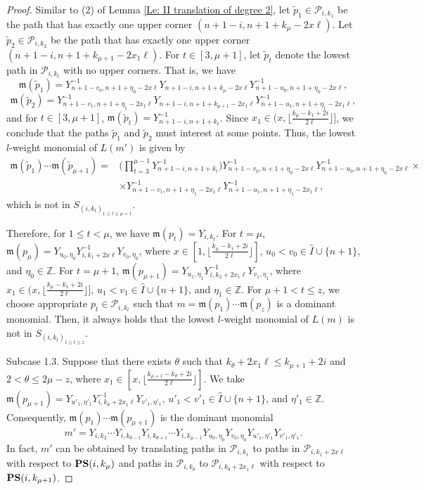 \documentclass[10pt,a4paper]{amsart}
\begin{document}
\begin{proof}
Similar to (2) of Lemma \ref{Le: II translation of degree 2}, let $\widetilde{p}_1\in \mathscr{P}_{i,k_1}$ be the path that has exactly one upper corner $(n+1-i,n+1+k_{\mu}-2x \ell)$. Let $\widetilde{p}_2\in \mathscr{P}_{i,k_2}$ be the path that has exactly one upper corner $(n+1-i,n+1+k_{\mu+1}-2x_1 \ell)$. For $t\in[3, \mu+1]$, let $\widetilde{p}_t$ denote the lowest path in $\mathscr{P}_{i,k_t}$ with no upper corners. That is, we have 
\[\mathfrak{m}(\widetilde{p}_{1})=Y_{n+1-v_0,n+1+\eta_0-2x \ell}^{-1}Y_{n+1-i,n+1+k_{\mu}-2x \ell}Y_{n+1-u_0, n+1+\eta_0-2x \ell}^{-1},
\]
\[
\mathfrak{m}(\widetilde{p}_{2})=Y_{n+1-v_1,n+1+\eta_1-2x_1 \ell}^{-1}Y_{n+1-i,n+1+k_{\mu+1}-2x_1 \ell}Y_{n+1-u_1, n+1+\eta_1-2x_1 \ell}^{-1},
\]
and for $t\in[3, \mu+1]$, $\mathfrak{m}(\widetilde{p}_{t})=Y_{n+1-i,n+1+k_t}^{-1}$. Since $x_1\in (x,\lfloor\frac{k_\mu-k_1+2i}{2 \ell}\rfloor]$, we conclude that the paths $\widetilde{p}_{1}$ and $\widetilde{p}_{2}$ must interest at some points. Thus, the lowest $l$-weight monomial of $L(m')$ is given by 
\begin{align*}
 \mathfrak{m}(\widetilde{p}_{1})\cdots \mathfrak{m}(\widetilde{p}_{\mu+1})=&\big( \prod_{t=3}^{\mu-1} Y_{n+1-i,n+1+k_{t}}^{-1} \big)
 Y_{n+1-v_0,n+1+\eta_0-2x \ell}^{-1} Y_{n+1-u_0,n+1+\eta_0-2x \ell}^{-1} \times \\
 & \times Y_{n+1-v_1,n+1+\eta_1-2x_1 \ell}^{-1}Y_{n+1-u_1,n+1+\eta_1-2x_1 \ell}^{-1}, 
\end{align*}
which is not in $S_{(i,k_t)_{1 \leq t \leq \mu+1}}$.


Therefore, for $1\leq t<\mu$, we have $\mathfrak{m}(p_t)=Y_{i,k_t}$. For $t=\mu$, $\mathfrak{m}(p_{\mu})=Y_{u_0,\eta_0}Y_{i,k_1+2x\ell}^{-1}Y_{v_0,\eta_0}$, where $x\in[1,\lfloor\frac{k_\mu-k_1+2i}{2 \ell}\rfloor]$, $u_0<v_0 \in \hat{I} \cup \{n+1\}$, and $\eta_0\in \mathbb{Z}$. For $t=\mu+1$, $\mathfrak{m}(p_{\mu+1})=Y_{u_1,\eta_1} Y_{i,k_2+2x_1\ell}^{-1}Y_{v_1,\eta_1}$, where $x_1\in (x,\lfloor\frac{k_{\mu}-k_1+2i}{2 \ell}\rfloor]$, $u_1<v_1\in \hat{I} \cup \{n+1\}$, and $\eta_1\in \mathbb{Z}$. For $\mu+1<t\leq z$, we choose appropriate $p_t\in\mathscr{P}_{i,k_t}$ such that $m=\mathfrak{m}(p_1)\cdots \mathfrak{m}(p_z)$ is a dominant monomial. Then, it always holds that the lowest $l$-weight monomial of $L(m)$ is not in $S_{(i,k_t)_{1 \leq t \leq z}}$.


Subcase 1.3. Suppose that there exists $\theta$ such that $k_\theta+2x_1\ell\leq k_{\mu+1}+2i$ and $2<\theta \leq 2\mu-z$, where $x_1\in [x,\lfloor\frac{k_{\mu+1}-k_\theta+2i}{2 \ell}\rfloor]$. We take $\mathfrak{m}(p_{\mu+1})=Y_{u'_1,\eta'_1} Y_{i,k_\theta+2x_1\ell}^{-1}Y_{v'_1,\eta'_1}$, $u'_1<v'_1\in \hat{I} \cup \{n+1\}$, and $\eta'_1\in \mathbb{Z}$. Consequently, $\mathfrak{m}(p_1)\cdots \mathfrak{m}(p_{\mu+1})$ is the dominant monomial
\[
m'=Y_{i,k_{2}}\cdots Y_{i,k_{\theta-1}}Y_{i,k_{\theta+1}}\cdots Y_{i,k_{\mu-1}} Y_{u_0,\eta_0}Y_{v_0,\eta_0} Y_{u'_1,\eta'_1}Y_{v'_1,\eta'_1}.
\]
In fact, $m'$ can be obtained by translating paths in $\mathscr{P}_{i,k_1}$ to paths in $\mathscr{P}_{i,k_1+2x \ell}$ with respect to ${\bf PS}(i,k_{\mu})$ and paths in $\mathscr{P}_{i,k_\theta}$ to $\mathscr{P}_{i,k_\theta+2x_1 \ell}$ with respect to ${\bf PS}(i,k_{\mu+1})$.


\end{proof}
\end{document}
